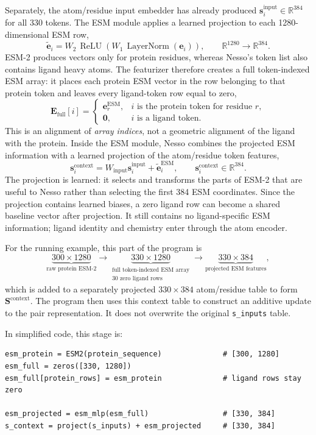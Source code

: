 \documentclass[11pt]{article}
\begin{document}
Separately, the atom/residue input embedder has already produced
$\mathbf s_i^{\mathrm{input}}\in\mathbb R^{384}$ for all 330 tokens. The ESM
module applies a learned projection to each 1280-dimensional ESM row,
\[
  \widetilde{\mathbf e}_i
  =W_2\,\operatorname{ReLU}\!\left(
  W_1\,\operatorname{LayerNorm}(\mathbf e_i)
  \right),
  \qquad
  \mathbb R^{1280}\longrightarrow\mathbb R^{384}.
\]
ESM-2 produces vectors only for protein residues, whereas Nesso's token list
also contains ligand heavy atoms. The featurizer therefore creates a full
token-indexed ESM array: it places each protein ESM vector in the row belonging
to that protein token and leaves every ligand-token row equal to zero,
\[
  \mathbf E_{\mathrm{full}}[i]=
  \begin{cases}
    \mathbf e_r^{\mathrm{ESM}}, &
      i\text{ is the protein token for residue }r,\\
    \mathbf 0, & i\text{ is a ligand token}.
  \end{cases}
\]
This is an alignment of \emph{array indices}, not a geometric alignment of the
ligand with the protein. Inside the ESM module, Nesso combines the projected
ESM information with a learned projection of the atom/residue token features,
\[
  \mathbf s_i^{\mathrm{context}}
  =W_{\mathrm{input}}\mathbf s_i^{\mathrm{input}}
  +\widetilde{\mathbf e}_i^{\mathrm{ESM}},
  \qquad \mathbf s_i^{\mathrm{context}}\in\mathbb R^{384}.
\]
The projection is learned: it selects and transforms the parts of ESM-2 that
are useful to Nesso rather than selecting the first 384 ESM coordinates. Since
the projection contains learned biases, a zero ligand row can become a shared
baseline vector after projection. It still contains no ligand-specific ESM
information; ligand identity and chemistry enter through the atom encoder.

For the running example, this part of the program is
\[
  \underbrace{300\times1280}_{\text{raw protein ESM-2}}
  \longrightarrow
  \underbrace{330\times1280}_{\substack{\text{full token-indexed ESM array}\\
  \text{30 zero ligand rows}}}
  \longrightarrow
  \underbrace{330\times384}_{\text{projected ESM features}},
\]
which is added to a separately projected $330\times384$ atom/residue table to
form $\mathbf S^{\mathrm{context}}$. The program then uses this context table
to construct an additive update to the pair representation. It does not
overwrite the original \texttt{s\_inputs} table.

In simplified code, this stage is:
\begin{verbatim}
esm_protein = ESM2(protein_sequence)              # [300, 1280]
esm_full = zeros([330, 1280])
esm_full[protein_rows] = esm_protein              # ligand rows stay zero

esm_projected = esm_mlp(esm_full)                 # [330, 384]
s_context = project(s_inputs) + esm_projected     # [330, 384]
\end{verbatim}
\end{document}
